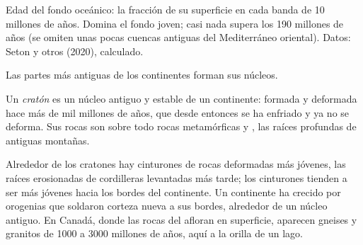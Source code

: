 \begin{omfigure}

{\small Edad del fondo oceánico: la fracción de su superficie en cada banda de
10 millones de años. Domina el fondo joven; casi nada supera los 190 millones
de años (se omiten unas pocas cuencas antiguas del Mediterráneo oriental).
Datos: Seton y otros (2020), calculado.}
\end{omfigure}

Las partes más antiguas de los continentes forman sus núcleos.

\begin{definition}[Cratón]\label{def:g12:continental-crust:craton}
Un \emph{cratón} es un núcleo antiguo y estable de un
continente:  formada y deformada hace más de mil millones
de años, que desde entonces se ha enfriado y ya no se deforma. Sus rocas son
sobre todo rocas metamórficas y , las raíces profundas de antiguas
montañas.
\end{definition}

Alrededor de los cratones hay cinturones de rocas deformadas más jóvenes, las
raíces erosionadas de cordilleras levantadas más tarde; los cinturones
tienden a ser más jóvenes hacia los bordes del continente. Un continente ha
crecido por orogenias que soldaron corteza nueva a sus bordes, alrededor de un
núcleo antiguo. En Canadá, donde las rocas del  afloran en superficie,
aparecen gneises y granitos de 1000 a 3000 millones de años, aquí a la orilla
de un lago.

